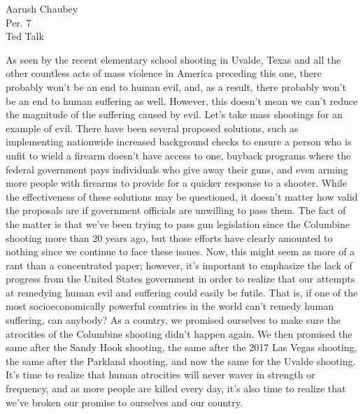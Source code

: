 \documentclass[11pt]{scrartcl}
\title{}
\author{}
\date{}
\begin{document}
\begin{flushright}
Aarush Chaubey\\
Per. 7\\
Ted Talk\\
\end{flushright}

\vspace{5mm}

As seen by the recent elementary school shooting in Uvalde, Texas and all the other countless acts of mass violence in America preceding this one, there probably won’t be an end to human evil, and, as a result, there probably won’t be an end to human suffering as well. However, this doesn’t mean we can’t reduce the magnitude of the suffering caused by evil. Let’s take mass shootings for an example of evil. There have been several proposed solutions, such as implementing nationwide increased background checks to ensure a person who is unfit to wield a firearm doesn’t have access to one, buyback programs where the federal government pays individuals who give away their guns, and even arming more people with firearms to provide for a quicker response to a shooter. While the effectiveness of these solutions may be questioned, it doesn’t matter how valid the proposals are if government officials are unwilling to pass them. The fact of the matter is that we’ve been trying to pass gun legislation since the Columbine shooting more than 20 years ago, but those efforts have clearly amounted to nothing since we continue to face these issues. Now, this might seem as more of a rant than a concentrated paper; however, it’s important to emphasize the lack of progress from the United States government in order to realize that our attempts at remedying human evil and suffering could easily be futile. That is, if one of the most socioeconomically powerful countries in the world can’t remedy human suffering, can anybody? As a country, we promised ourselves to make sure the atrocities of the Columbine shooting didn’t happen again. We then promised the same after the Sandy Hook shooting, the same after the 2017 Las Vegas shooting, the same after the Parkland shooting, and now the same for the Uvalde shooting. It’s time to realize that human atrocities will never waver in strength or frequency, and as more people are killed every day, it’s also time to realize that we’ve broken our promise to ourselves and our country. 
\end{document}
